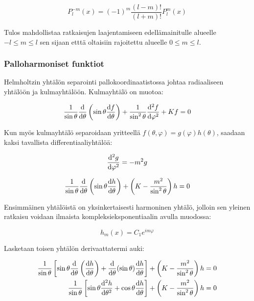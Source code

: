 \documentclass[../johdoksia.tex]{subfiles}
\begin{document}
	\begin{equation}
		\label{assocleg}
		\boxed{P_l^{-m}(x) = (-1)^m\frac{(l - m)!}{(l + m)!}P_l^m(x)}
	\end{equation}

	Tulos mahdollistaa ratkaisujen laajentamiseen edellämainitulle alueelle $-l \leq m \leq l$ sen sijaan etttä oltaisiin rajoitettu alueelle $0 \leq m \leq l$.
	
	\subsubsection{Palloharmoniset funktiot}
	
	Helmholtzin yhtälön separointi pallokoordinaatistossa johtaa radiaaliseen yhtälöön ja kulmayhtälöön. Kulmayhtälö on muotoa:
	
	\begin{equation}
		\frac{1}{\sin\theta}\odv{}{\theta}\left(\sin\theta\odv{f}{\theta}\right) + \frac{1}{\sin^2\theta}\odv{^2f}{\varphi^2} + Kf = 0
	\end{equation}

	Kun myös kulmayhtälö separoidaan yritteellä $f(\theta, \varphi) = g(\varphi)h(\theta)$, saadaan kaksi tavallista differentiaaliyhtälöä:
	
	\begin{equation*}
		\odv{^2g}{\varphi^2} = -m^2g	
	\end{equation*}

	\begin{equation*}
		\frac{1}{\sin\theta}\odv{}{\theta}\left(\sin\theta\odv{h}{\theta}\right) + \left(K - \frac{m^2}{\sin^2\theta}\right)h = 0
	\end{equation*}

	Ensimmäinen yhtälöistä on yksinkertaisesti harmoninen yhtälö, jolloin sen yleinen ratkaisu voidaan ilmaista kompleksieksponentiaalin avulla muodossa:
	
	\begin{equation}
		\boxed{h_m(x) = C_1e^{im\varphi}}
	\end{equation}

	Lasketaan toisen yhtälön derivaattatermi auki:
	
	\begin{align*}
		\frac{1}{\sin\theta}\left[\sin\theta\odv{}{\theta}\left(\odv{h}{\theta}\right) + \odv{}{\theta}(\sin\theta)\odv{h}{\theta}\right] + \left(K - \frac{m^2}{\sin^2\theta}\right)h &= 0 \\
		\frac{1}{\sin\theta}\left[\sin\theta\odv{^2h}{\theta^2} + \cos\theta\odv{h}{\theta}\right] + \left(K - \frac{m^2}{\sin^2\theta}\right)h &= 0
	\end{align*}
\end{document}
